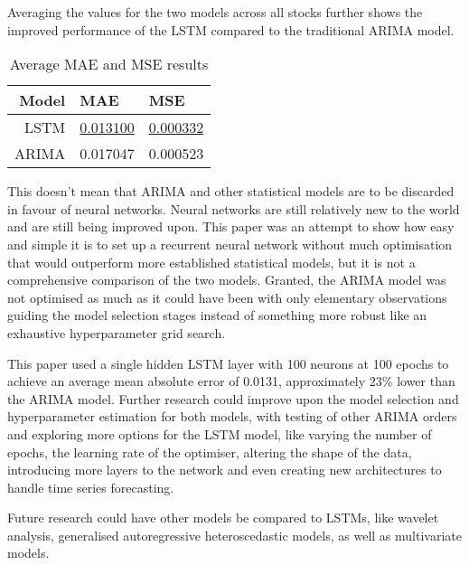 Averaging the values for the two models across all stocks further shows the improved performance of the LSTM compared to the traditional ARIMA model.
\begin{table}[H]
    \centering
    \begin{tabular}{r|l|l}
        \hline
        \textbf{Model}      & \textbf{MAE} & \textbf{MSE} \\ 
        \hline
        LSTM & \underline{0.013100} & \underline{0.000332}\\
        \hline
        ARIMA & 0.017047 & 0.000523\\
    \end{tabular}
    \caption{Average MAE and MSE results}
    \label{tab:averaqe_error_values_models}
\end{table}
This doesn't mean that ARIMA and other statistical models are to be discarded in favour of neural networks. Neural networks are still relatively new to the world and are still being improved upon. This paper was an attempt to show how easy and simple it is to set up a recurrent neural network without much optimisation that would outperform more established statistical models, but it is not a comprehensive comparison of the two models. Granted, the ARIMA model was not optimised as much as it could have been with only elementary observations guiding the model selection stages instead of something more robust like an exhaustive hyperparameter grid search.

This paper used a single hidden LSTM layer with 100 neurons at 100 epochs to achieve an average mean absolute error of 0.0131, approximately 23\% lower than the ARIMA model. Further research could improve upon the model selection and hyperparameter estimation for both models, with testing of other ARIMA orders and exploring more options for the LSTM model, like varying the number of epochs, the learning rate of the optimiser, altering the shape of the data, introducing more layers to the network and even creating new architectures to handle time series forecasting. 

Future research could have other models be compared to LSTMs, like wavelet analysis, generalised autoregressive heteroscedastic models, as well as multivariate models.